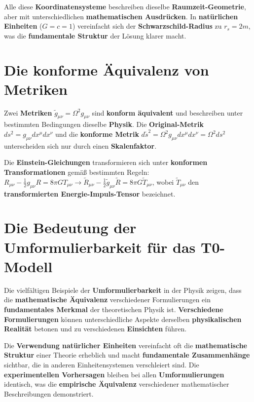 \documentclass[12pt,a4paper]{report}
\begin{document}
	Alle diese \textbf{Koordinatensysteme} beschreiben dieselbe \textbf{Raumzeit-Geometrie}, aber mit unterschiedlichen \textbf{mathematischen Ausdrücken}. In \textbf{natürlichen Einheiten} ($G = c = 1$) vereinfacht sich der \textbf{Schwarzschild-Radius} zu $r_s = 2m$, was die \textbf{fundamentale Struktur} der Lösung klarer macht.
	
	\section{Die konforme Äquivalenz von Metriken}
	
	Zwei \textbf{Metriken} $\tilde{g}_{\mu\nu} = \Omega^2 g_{\mu\nu}$ sind \textbf{konform äquivalent} und beschreiben unter bestimmten Bedingungen dieselbe \textbf{Physik}. Die \textbf{Original-Metrik} $ds^2 = g_{\mu\nu}dx^\mu dx^\nu$ und die \textbf{konforme Metrik} $d\tilde{s}^2 = \Omega^2 g_{\mu\nu}dx^\mu dx^\nu = \Omega^2 ds^2$ unterscheiden sich nur durch einen \textbf{Skalenfaktor}.
	
	Die \textbf{Einstein-Gleichungen} transformieren sich unter \textbf{konformen Transformationen} gemäß bestimmten Regeln: $R_{\mu\nu} - \frac{1}{2}g_{\mu\nu}R = 8\pi G T_{\mu\nu} \to \tilde{R}_{\mu\nu} - \frac{1}{2}\tilde{g}_{\mu\nu}\tilde{R} = 8\pi G \tilde{T}_{\mu\nu}$, wobei $\tilde{T}_{\mu\nu}$ den \textbf{transformierten Energie-Impuls-Tensor} bezeichnet.
	
	\section{Die Bedeutung der Umformulierbarkeit für das T0-Modell}
	
	Die vielfältigen Beispiele der \textbf{Umformulierbarkeit} in der Physik zeigen, dass die \textbf{mathematische Äquivalenz} verschiedener Formulierungen ein \textbf{fundamentales Merkmal} der theoretischen Physik ist. \textbf{Verschiedene Formulierungen} können unterschiedliche Aspekte derselben \textbf{physikalischen Realität} betonen und zu verschiedenen \textbf{Einsichten} führen.
	
	Die \textbf{Verwendung natürlicher Einheiten} vereinfacht oft die \textbf{mathematische Struktur} einer Theorie erheblich und macht \textbf{fundamentale Zusammenhänge} sichtbar, die in anderen Einheitensystemen verschleiert sind. Die \textbf{experimentellen Vorhersagen} bleiben bei allen \textbf{Umformulierungen} identisch, was die \textbf{empirische Äquivalenz} verschiedener mathematischer Beschreibungen demonstriert.
	
\end{document}
